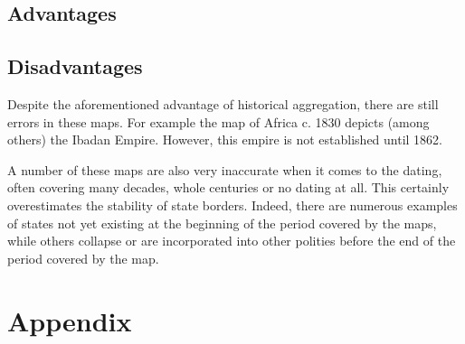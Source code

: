 \documentclass[12pt]{article}
\begin{document}
\subsection{Advantages}
\subsection{Disadvantages}
Despite the aforementioned advantage of historical aggregation, there are still errors in these maps. 
For example the \citet{Kasule1998} map of Africa c. 1830 depicts (among others) the Ibadan Empire. 
However, this empire is not established until 1862.

A number of these maps are also very inaccurate when it comes to the dating, often covering many decades, whole centuries or no dating at all. 
This certainly overestimates the stability of state borders.
Indeed, there are numerous examples of states not yet existing at the beginning of the period covered by the maps, while others collapse or are incorporated into other polities before the end of the period covered by the map.

\pagebreak




\section{Appendix}
\end{document}
